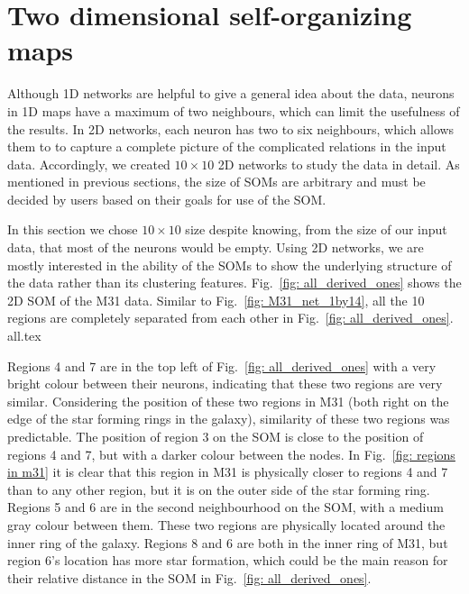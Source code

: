  \section{Two dimensional self-organizing maps}
 \label{sec: 2d_cluster}
    Although 1D networks are helpful to give a general idea about the data, neurons in 1D maps have a maximum of two neighbours, which can limit the usefulness of the results.
    In 2D networks, each neuron has two to six neighbours, which allows them to to capture a complete picture of the complicated relations in the input data.
    Accordingly, we created $10\times10$ 2D networks to study the data in detail.
    As mentioned in previous sections, the size of SOMs are arbitrary and must be decided by users based on their goals for use of the SOM.
    
    In this section we chose $10\times10$ size despite knowing, from the size of our input data, that most of the neurons would be empty.
    Using 2D networks, we are mostly interested in the ability of the SOMs to show the underlying structure of the data rather than its clustering features.
    Fig.~\ref{fig: all_derived_ones} shows the 2D SOM of the M31 data.
    Similar to Fig.~\ref{fig: M31_net_1by14}, all the 10 regions are completely separated from each other in Fig.~\ref{fig: all_derived_ones}.
    {all.tex}
    
    Regions 4 and 7 are in the top left of Fig.~\ref{fig: all_derived_ones} with a very bright colour between their neurons, indicating that these two regions are very similar.
    Considering the position of these two regions in M31 (both right on the edge of the star forming rings in the galaxy), similarity of these two regions was predictable.
    The position of region 3 on the SOM is close to the position of regions 4 and 7, but with a darker colour between the nodes. 
    In Fig.~\ref{fig: regions in m31} it is clear that this region in M31 is physically closer to regions 4 and 7 than to any other region, but it is on the outer side of the star forming ring.
    Regions 5 and 6 are in the second neighbourhood on the SOM, with a medium gray colour between them.
    These two regions are physically located around the inner ring of the galaxy.
    Regions 8 and 6 are both in the inner ring of M31, but region 6's location has more star formation, which could be the main reason for their relative distance in the SOM in Fig.~\ref{fig: all_derived_ones}. 
    
